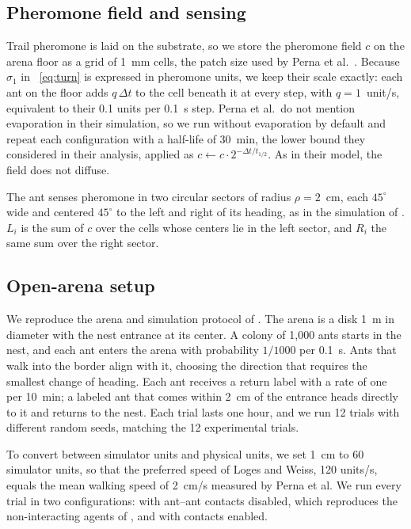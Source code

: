 \documentclass[9pt,twoside]{pnas-new}
\begin{document}
\subsection{Pheromone field and sensing}
Trail pheromone is laid on the substrate, so we store the pheromone field $c$ on the arena floor as a grid of 1~mm cells, the patch size used by Perna et al.\ \cite{perna2012}. Because $\sigma_1$ in ~\eqref{eq:turn} is expressed in pheromone units, we keep their scale exactly: each ant on the floor adds $q\,\Delta t$ to the cell beneath it at every step, with $q = 1$~unit/s, equivalent to their 0.1 units per 0.1~s step. Perna et al.\ do not mention evaporation in their simulation, so we run without evaporation by default and repeat each configuration with a half-life of 30~min, the lower bound they considered in their analysis, applied as $c \gets c \cdot 2^{-\Delta t / t_{1/2}}$. As in their model, the field does not diffuse.

The ant senses pheromone in two circular sectors of radius $\rho = 2$~cm, each $45^\circ$ wide and centered $45^\circ$ to the left and right of its heading, as in the simulation of \cite{perna2012}. $L_i$ is the sum of $c$ over the cells whose centers lie in the left sector, and $R_i$ the same sum over the right sector.

\subsection{Open-arena setup}
We reproduce the arena and simulation protocol of \cite{perna2012}. The arena is a disk 1~m in diameter with the nest entrance at its center. A colony of 1{,}000 ants starts in the nest, and each ant enters the arena with probability $1/1000$ per 0.1~s. Ants that walk into the border align with it, choosing the direction that requires the smallest change of heading. Each ant receives a return label with a rate of one per 10~min; a labeled ant that comes within 2~cm of the entrance heads directly to it and returns to the nest. Each trial lasts one hour, and we run 12 trials with different random seeds, matching the 12 experimental trials.

To convert between simulator units and physical units, we set 1~cm to 60 simulator units, so that the preferred speed of Loges and Weiss, 120 units/s, equals the mean walking speed of 2~cm/s measured by Perna et al. We run every trial in two configurations: with ant--ant contacts disabled, which reproduces the non-interacting agents of \cite{perna2012}, and with contacts enabled.
\end{document}
